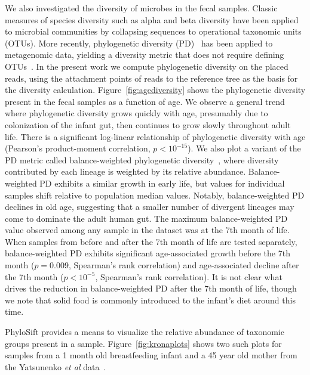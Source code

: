 \documentclass[10pt]{article}
\begin{document}
We also investigated the diversity of microbes in the fecal samples.
Classic measures of species diversity such as alpha and beta diversity have been applied to microbial communities by collapsing sequences to operational taxonomic units (OTUs).
More recently, phylogenetic diversity (PD)~\cite{Faith1992} has been applied to metagenomic data, yielding a diversity metric that does not require defining OTUs~\cite{Kembel2011}.
In the present work we compute phylogenetic diversity on the placed reads, using the attachment points of reads to the reference tree as the basis for the diversity calculation.
Figure~\ref{fig:agediversity} shows the phylogenetic diversity present in the fecal samples as a function of age.
We observe a general trend where phylogenetic diversity grows quickly with age, presumably due to colonization of the infant gut, then continues to grow slowly throughout adult life.
There is a significant log-linear relationship of phylogenetic diversity with age (Pearson's product-moment correlation, $p<10^{-15}$).
We also plot a variant of the PD metric called balance-weighted phylogenetic diversity~\cite{mccoy2013abundance}, where diversity contributed by each lineage is weighted by its relative abundance.
Balance-weighted PD exhibits a similar growth in early life, but values for individual samples shift relative to population median values.
Notably, balance-weighted PD declines in old age, suggesting that a smaller number of divergent lineages may come to dominate the adult human gut.
The maximum balance-weighted PD value observed among any sample in the dataset was at the 7th month of life.
When samples from before and after the 7th month of life are tested separately, balance-weighted PD exhibits significant age-associated growth before the 7th month ($p=0.009$, Spearman's rank correlation) and age-associated decline after the 7th month ($p<10^{-5}$, Spearman's rank correlation).
It is not clear what drives the reduction in balance-weighted PD after the 7th month of life, though we note that solid food is commonly introduced to the infant's diet around this time.

PhyloSift provides a means to visualize the relative abundance of taxonomic groups present in a sample.
Figure~\ref{fig:kronaplots} shows two such plots for samples from a 1 month old breastfeeding infant and a 45 year old mother from the Yatsunenko \textit{et al} data~\cite{Yatsunenko2012}.
\end{document}
